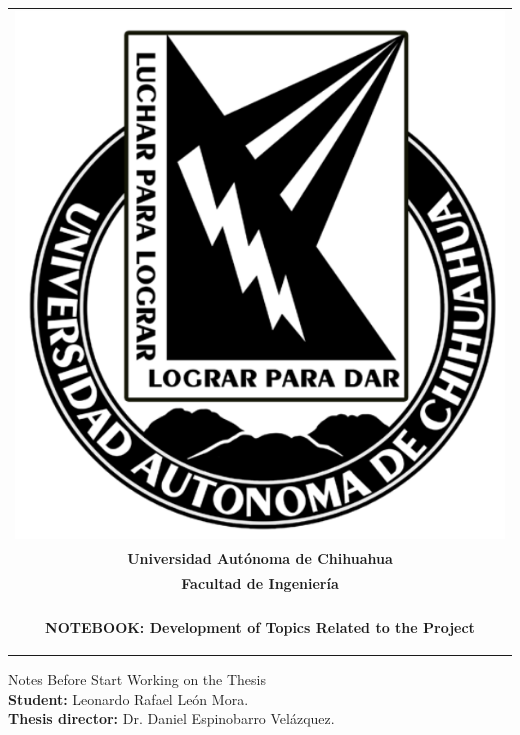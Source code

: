 \documentclass[12pt]{report}
\begin{document}
	
	\begin{titlepage}
		\begin{center}
			\begin{tabular}{c}
				\includegraphics[scale=0.2]{BN_uach.png}\\[3.5ex]
				\textbf{\LARGE Universidad Autónoma de Chihuahua}\\[3.5ex]
				\textbf{\Large Facultad de Ingeniería}\\[3.5ex]
				\hline\\[3ex]
				\begin{minipage}{17cm}
					\centering
					\begin{doublespace}
						\textbf{\LARGE NOTEBOOK: Development of Topics Related to the Project}
					\end{doublespace}
				\end{minipage}\\[3.5ex]
				\hline
			\end{tabular}\vfill
			{\large Notes Before Start Working on the Thesis}\\\vfill
			{\large \textbf{Student:} Leonardo Rafael León Mora.}\\\vfill
			{\large \textbf{Thesis director:} Dr. Daniel Espinobarro Velázquez.}\\\vfill

\end{center}
\end{titlepage}
\end{document}
